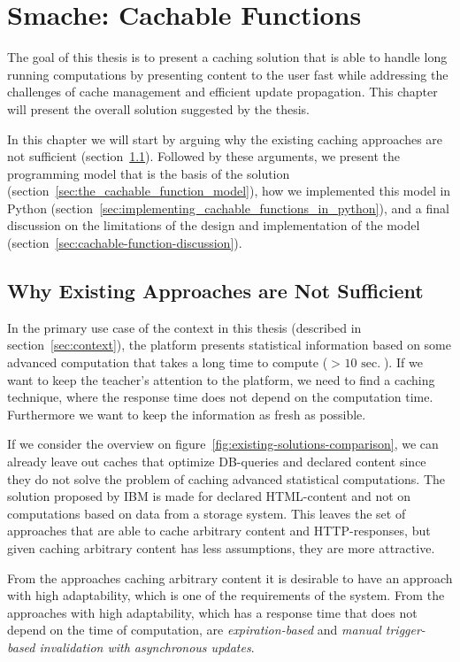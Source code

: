 \chapter{Smache: Cachable Functions}
\label{chapter:smache-cachable-functions}

The goal of this thesis is to present a caching solution that is able to handle long running computations by presenting content to the user fast while addressing the challenges of cache management and efficient update propagation. This chapter will present the overall solution suggested by the thesis.

In this chapter we will start by arguing why the existing caching approaches are not sufficient (section~\ref{sec:existing-approaches-are-not-sufficient}). Followed by these arguments, we present the programming model that is the basis of the solution (section~\ref{sec:the_cachable_function_model}), how we implemented this model in Python (section~\ref{sec:implementing_cachable_functions_in_python}), and a final discussion on the limitations of the design and implementation of the model (section~\ref{sec:cachable-function-discussion}).

\section{Why Existing Approaches are Not Sufficient}
\label{sec:existing-approaches-are-not-sufficient}

In the primary use case of the context in this thesis (described in section~\ref{sec:context}), the platform presents statistical information based on some advanced computation that takes a long time to compute ($>\text{ 10 sec.}$). If we want to keep the teacher's attention to the platform, we need to find a caching technique, where the response time does not depend on the computation time. Furthermore we want to keep the information as fresh as possible.

If we consider the overview on figure~\ref{fig:existing-solutions-comparison}, we can already leave out caches that optimize DB-queries and declared content since they do not solve the problem of caching advanced statistical computations. The solution proposed by IBM is made for declared HTML-content and not on computations based on data from a storage system. This leaves the set of approaches that are able to cache arbitrary content and HTTP-responses, but given caching arbitrary content has less assumptions, they are more attractive.

From the approaches caching arbitrary content it is desirable to have an approach with high adaptability, which is one of the requirements of the system. From the approaches with high adaptability, which has a response time that does not depend on the time of computation, are \emph{expiration-based} and \emph{manual trigger-based invalidation with asynchronous updates}.

